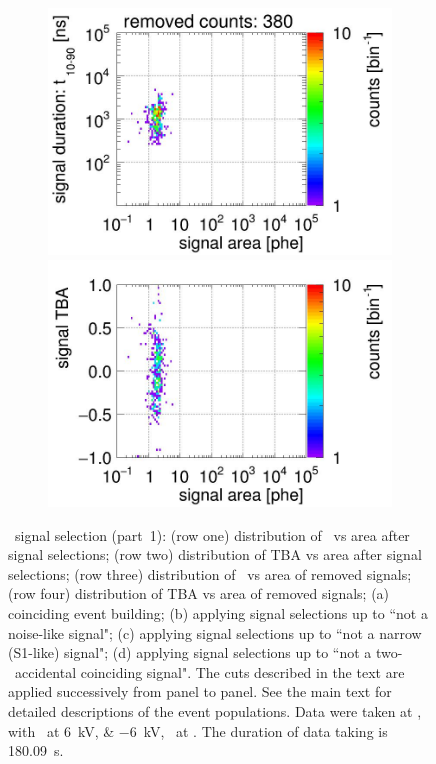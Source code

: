 \begin{landscape}
\begin{figure}[!p]
\begin{subfigure}[t]{0.32\textwidth}
	\includegraphics[width=\figurewidth,clip,trim={0 98 0 15}]{Figures/GasTest/CutsValid/res64767/pdpaX06Vecfig64767.jpg}
	\includegraphics[width=\figurewidth,clip,trim={0 8 0 40}]{Figures/GasTest/CutsValid/res64767/tbapaX06Vecfig64767.jpg}
	\caption{}
	\label{fig:signal selection 06}
\end{subfigure}
	\caption[\gtest\ signal selection (part~1).]{\gtest\ signal selection (part~1): 
			(row one) distribution of \rpdshort\ vs area after signal selections;
(row two) distribution of TBA vs area after signal selections;
(row three) distribution of \rpdshort\ vs area of removed signals;
(row four) distribution of TBA vs area of removed signals;
		(a) coinciding event building; 
		(b) applying signal selections up to ``not a noise-like signal";
		(c) applying signal selections up to ``not a narrow (S1-like) signal";
		(d) applying signal selections up to ``not a two-\sphe\ accidental coinciding signal".
		The cuts described in the text are applied successively from panel to panel. See the main text for detailed descriptions of the event populations.
		Data were taken at , with \opvtvb\ at \SIlist{+6;-6}{kV}, \opgd\ at \standarddensity . The duration of data taking is \SI{180.09}{\s}.
     }
	\label{fig:signal selection l1}
\end{figure}
\end{landscape}
